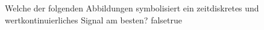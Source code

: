     {Welche der folgenden Abbildungen symbolisiert ein zeitdiskretes und wertkontinuierliches Signal am besten?}
    {}
    {}
    {}
    {}
    {false}{true}